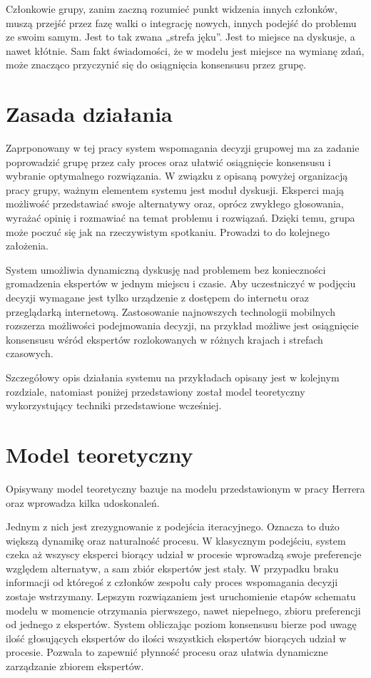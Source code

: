 Członkowie grupy, zanim zaczną rozumieć punkt widzenia innych członków, muszą 
przejść przez fazę walki o integrację nowych, innych podejść do problemu ze 
swoim samym. Jest to tak zwana „strefa jęku”. Jest to miejsce na dyskusje, a 
nawet kłótnie. Sam fakt świadomości, że w modelu jest miejsce na wymianę zdań, 
może znacząco przyczynić się do osiągnięcia konsensusu przez grupę.

\section{Zasada działania}
Zaprponowany w tej pracy system wspomagania decyzji grupowej ma za zadanie
poprowadzić grupę przez cały proces oraz ułatwić osiągnięcie konsensusu i
wybranie optymalnego rozwiązania. W związku z opisaną powyżej organizacją pracy
grupy, ważnym elementem systemu jest moduł dyskusji. Eksperci mają możliwość
przedstawiać swoje alternatywy oraz, oprócz zwykłego głosowania, wyrażać opinię
i rozmawiać na temat problemu i rozwiązań. Dzięki temu, grupa może poczuć się
jak na rzeczywistym spotkaniu. Prowadzi to do kolejnego założenia.

System umożliwia dynamiczną dyskusję nad problemem bez konieczności gromadzenia 
ekspertów w jednym miejscu i czasie. Aby uczestniczyć w podjęciu decyzji 
wymagane jest tylko urządzenie z dostępem do internetu oraz przeglądarką 
internetową. Zastosowanie najnowszych technologii mobilnych rozszerza możliwości
podejmowania decyzji, na przykład możliwe jest osiągnięcie konsensusu wśród 
ekspertów rozlokowanych w różnych krajach i strefach czasowych.

Szczegółowy opis działania systemu na przykładach opisany jest w kolejnym 
rozdziale, natomiast poniżej przedstawiony został model teoretyczny 
wykorzystujący techniki przedstawione wcześniej.

\section{Model teoretyczny}
Opisywany model teoretyczny bazuje na modelu przedstawionym w pracy Herrera
 oraz wprowadza kilka udoskonaleń.

Jednym z nich jest zrezygnowanie z podejścia iteracyjnego. Oznacza to dużo
większą dynamikę oraz naturalność procesu. W klasycznym podejściu, system czeka
aż wszyscy eksperci biorący udział w procesie wprowadzą swoje preferencje
względem alternatyw, a sam zbiór ekspertów jest stały. W przypadku braku
informacji od któregoś z członków zespołu cały proces wspomagania decyzji
zostaje wstrzymany. 
Lepszym rozwiązaniem jest uruchomienie etapów schematu modelu w momencie
otrzymania pierwszego, nawet niepełnego, zbioru preferencji od jednego z
ekspertów. System obliczając poziom konsensusu bierze pod uwagę ilość
głosujących ekspertów do ilości wszystkich ekspertów biorących udział w
procesie. Pozwala to zapewnić płynność procesu oraz ułatwia dynamiczne
zarządzanie zbiorem ekspertów.

